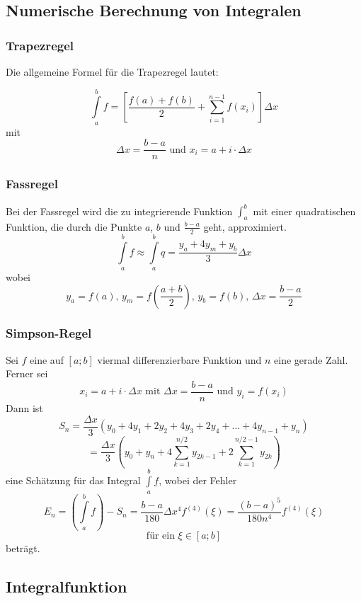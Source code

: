 \subsection{Numerische Berechnung von Integralen}


\subsubsection{Trapezregel}

Die allgemeine Formel für die Trapezregel lautet:

$$\int\limits_a^b f = \left[\frac{f(a) + f(b)}{2} + \sum_{i=1}^{n-1}
    f(x_i)\right] \Delta x$$
mit
$$\Delta x = \frac{b-a}{n} \textrm{ und } x_i = a + i \cdot \Delta x$$


\subsubsection{Fassregel}

Bei der Fassregel wird die zu integrierende Funktion $\int_a^b$ mit einer
quadratischen Funktion, die durch die Punkte $a$, $b$ und $\frac{b-a}{2}$ geht,
approximiert.
$$\int\limits_a^b f \approx \int\limits_a^b q = \frac{y_a + 4y_m
    + y_b}{3} \Delta x$$
wobei
$$y_a = f(a) \textrm{, } y_m = f\left(\frac{a+b}{2}\right) \textrm{, } y_b
    = f(b) \textrm{, } \Delta x = \frac{b-a}{2}$$


\subsubsection{Simpson-Regel}

Sei $f$ eine auf $[a;b]$ viermal differenzierbare Funktion und $n$ eine gerade
Zahl. Ferner sei
$$x_i = a + i \cdot \Delta x \textrm{ mit } \Delta x = \frac{b-a}{n}
    \textrm{ und } y_i = f(x_i)$$
Dann ist
$$S_n = \frac{\Delta x}{3}(y_0 + 4y_1 + 2y_2 + 4y_3 + 2y_4 + ... + 4y_{n-1}
    + y_n)$$
$$= \frac{\Delta x}{3}\left(y_0 + y_n + 4 \sum_{k=1}^{n/2} y_{2k-1} + 2
    \sum_{k=1}^{n/2-1} y_{2k}\right)$$
eine Schätzung für das Integral $\int\limits_a^b f$, wobei der Fehler
$$E_n = \left(\int\limits_a^b f\right) - S_n = \frac{b-a}{180}\Delta x^4
    f^{(4)}(\xi) = \frac{(b-a)^5}{180n^4} f^{(4)}(\xi)$$
$$\textrm{für ein } \xi \in [a;b]$$
beträgt.


\subsection{Integralfunktion}

